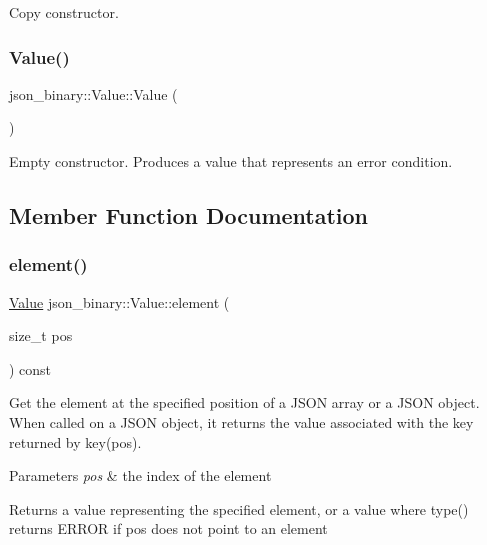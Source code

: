 Copy constructor. \mbox{\label{classjson__binary_1_1Value_aaa07e73820e6dfe8727fa473de0dfe37}} 
\subsubsection{\texorpdfstring{Value()}{Value()}\hspace{0.1cm}{\footnotesize\ttfamily [8/8]}}
{\footnotesize\ttfamily json\+\_\+binary\+::\+Value\+::\+Value (\begin{DoxyParamCaption}{ }\end{DoxyParamCaption})\hspace{0.3cm}{\ttfamily [inline]}}

Empty constructor. Produces a value that represents an error condition. 

\subsection{Member Function Documentation}
\mbox{\label{classjson__binary_1_1Value_acea99f0727f240b2ec552a8fae60855d}} 
\subsubsection{\texorpdfstring{element()}{element()}}
{\footnotesize\ttfamily \mbox{\hyperlink{classjson__binary_1_1Value}{Value}} json\+\_\+binary\+::\+Value\+::element (\begin{DoxyParamCaption}\item[{size\+\_\+t}]{pos }\end{DoxyParamCaption}) const}

Get the element at the specified position of a J\+S\+ON array or a J\+S\+ON object. When called on a J\+S\+ON object, it returns the value associated with the key returned by key(pos).


\begin{DoxyParams}{Parameters}
{\em pos} & the index of the element \\
\hline
\end{DoxyParams}
\begin{DoxyReturn}{Returns}
a value representing the specified element, or a value where type() returns E\+R\+R\+OR if pos does not point to an element 
\end{DoxyReturn}
\mbox{\label{classjson__binary_1_1Value_aa45a919f10c1421d765ecfbc8491aa95}} 
